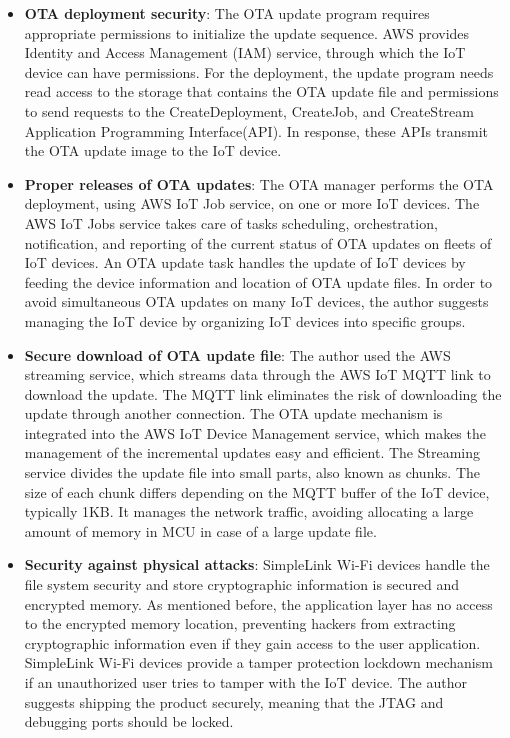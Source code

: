\documentclass[12pt,a4paper]{article}
\begin{document}
\begin{itemize}

\item  \textbf{OTA deployment security}: The OTA update program requires appropriate permissions to initialize the update sequence. AWS provides Identity and Access Management (IAM) service, through which the IoT device can have permissions. For the deployment, the update program needs read access to the storage that contains the OTA update file and permissions to send requests to the CreateDeployment, CreateJob, and CreateStream Application Programming Interface(API). In response, these APIs transmit the OTA update image to the IoT device. \cite{r27}

\item \textbf{Proper releases of OTA updates}: The OTA manager performs the OTA deployment, using AWS IoT Job service, on one or more IoT devices. The AWS IoT Jobs service takes care of tasks scheduling, orchestration, notification, and reporting of the current status of OTA updates on fleets of IoT devices. An OTA update task handles the update of IoT devices by feeding the device information and location of OTA update files. In order to avoid simultaneous OTA updates on many IoT devices, the author suggests managing the IoT device by organizing IoT devices into specific groups.\cite{r27}

\item \textbf{Secure download of OTA update file}: The author used the AWS streaming service, which streams data through the AWS IoT MQTT link to download the update. The MQTT link eliminates the risk of downloading the update through another connection. The OTA update mechanism is integrated into the AWS IoT Device Management service, which makes the management of the incremental updates easy and efficient. The Streaming service divides the update file into small parts, also known as chunks. The size of each chunk differs depending on the MQTT buffer of the IoT device, typically 1KB. It manages the network traffic, avoiding allocating a large amount of memory in MCU in case of a large update file. \cite{r27}

\item \textbf{Security against physical attacks}: SimpleLink Wi-Fi devices handle the file system security and store cryptographic information is secured and encrypted memory. As mentioned before, the application layer has no access to the encrypted memory location, preventing hackers from extracting cryptographic information even if they gain access to the user application. SimpleLink Wi-Fi devices provide a tamper protection lockdown mechanism if an unauthorized user tries to tamper with the IoT device. The author suggests shipping the product securely, meaning that the JTAG and debugging ports should be locked. \cite{r27}


\end{itemize}
\end{document}
